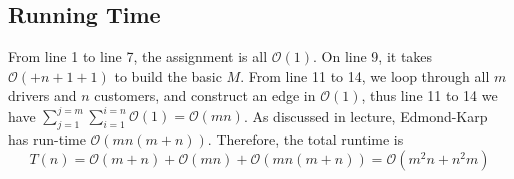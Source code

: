 \documentclass[openany]{article}
\begin{document}
\subsection*{Running Time}
From line 1 to line 7, the assignment is all $\mathcal{O}(1)$. On line 9, it takes $\mathcal{O}(+n+1+1)$ to build the basic $M$. From line 11 to 14, we loop through all $m$ drivers and $n$ customers, and construct an edge in $\mathcal{O}(1)$, thus line 11 to 14 we have $\sum_{j=1}^{j=m}\sum_{i=1}^{i=n}\mathcal{O}(1) = \mathcal{O}(mn)$. As discussed in lecture, Edmond-Karp has run-time $\mathcal{O}(mn(m+n))$. Therefore, the total runtime is
\[T(n) = \mathcal{O}(m+n) + \mathcal{O}(mn) + \mathcal{O}(mn(m+n)) = \mathcal{O}(m^2n+n^2m)\]
\end{document}
